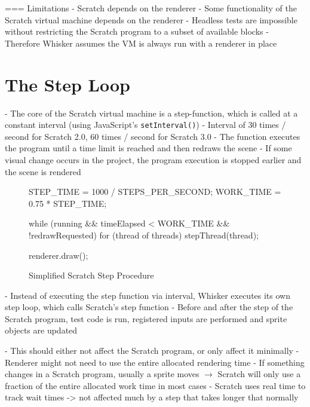 === Limitations
- Scratch depends on the renderer
    - Some functionality of the Scratch virtual machine depends on the renderer
    - Headless tests are impossible without restricting the Scratch program to a subset of available blocks
- Therefore Whisker assumes the VM is always run with a renderer in place

\section{The Step Loop}

- The core of the Scratch virtual machine is a step-function, which is called at a constant interval (using JavaScript's \texttt{setInterval()})
- Interval of 30 times / second for Scratch 2.0, 60 times / second for Scratch 3.0
- The function executes the program until a time limit is reached and then redraws the scene
- If some visual change occurs in the project, the program execution is stopped earlier and the scene is rendered

\begin{figure}
    \centering
    \begin{javascriptcode}
        STEP_TIME = 1000 / STEPS_PER_SECOND;
        WORK_TIME = 0.75 * STEP_TIME;

        while (running &&
               timeElapsed < WORK_TIME &&
               !redrawRequested) {
            for (thread of threads) {
                stepThread(thread);
            }
        }

        renderer.draw();
    \end{javascriptcode}
    \caption{Simplified Scratch Step Procedure}
    \label{fig:simplified_scratch_step_procedure}
\end{figure}

- Instead of executing the step function via interval, Whisker executes its own step loop, which calls Scratch's step function
- Before and after the step of the Scratch program, test code is run, registered inputs are performed and sprite objects are updated

- This should either not affect the Scratch program, or only affect it minimally
    - Renderer might not need to use the entire allocated rendering time
    - If something changes in a Scratch program, usually a sprite moves $\rightarrow$ Scratch will only use a fraction of the entire allocated work time in most cases
    - Scratch uses real time to track wait times -> not affected much by a step that takes longer that normally

